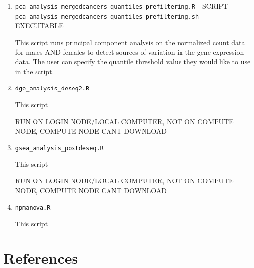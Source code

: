 \documentclass[10pt]{article}
\begin{document}
\begin{enumerate}
\item\texttt{pca\_analysis\_mergedcancers\_quantiles\_prefiltering.R} - SCRIPT\newline
\texttt{pca\_analysis\_mergedcancers\_quantiles\_prefiltering.sh} - EXECUTABLE

This script runs principal component analysis on the normalized count data for males AND females to detect sources of variation in the gene expression data. The user can specify the quantile threshold value they would like to use in the script.
	
\item\texttt{dge\_analysis\_deseq2.R}
	
This script 

RUN ON LOGIN NODE/LOCAL COMPUTER, NOT ON COMPUTE NODE, COMPUTE NODE CANT DOWNLOAD
	
\item\texttt{gsea\_analysis\_postdeseq.R}
	
This script

RUN ON LOGIN NODE/LOCAL COMPUTER, NOT ON COMPUTE NODE, COMPUTE NODE CANT DOWNLOAD
	
\item\texttt{npmanova.R}
	
This script
	
\end{enumerate}

\clearpage\newpage
\section{References}


\nocite{*}
\printbibliography[heading=none, sorting=nyt]
\newpage

%

%
\end{document}
